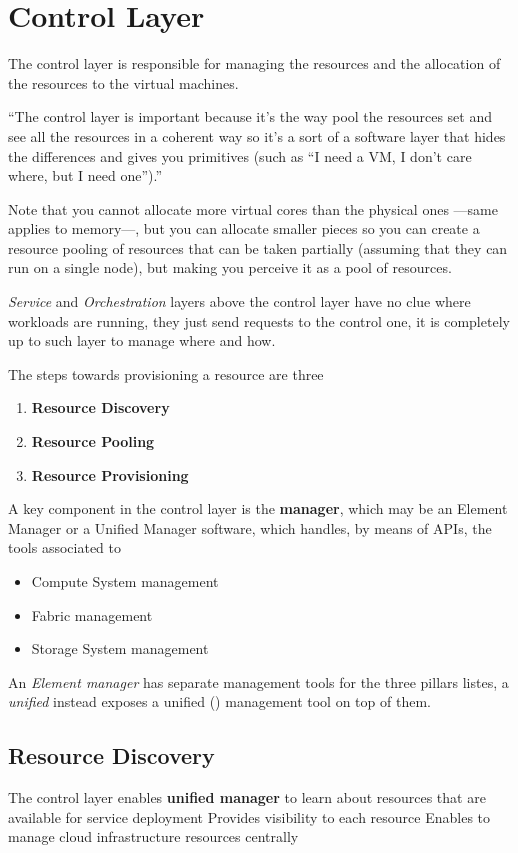 \section{Control Layer}
The control layer is responsible for managing the resources and the allocation of the resources to the virtual machines.

\begin{definition}
   ``The control layer is important because it's the way pool the resources set and see all the resources in a coherent way so it's a sort of a software layer that hides the differences and gives you primitives (such as ``I need a VM, I don't care where, but I need one'').''
\end{definition}


Note that you cannot allocate more virtual cores than the physical ones ---same applies to memory---, but you can allocate smaller pieces so you can create a resource pooling of resources that can be taken partially (assuming that they can run on a single node), but making you perceive it as a pool of resources.

\textit{Service} and \textit{Orchestration} layers above the control layer have no clue where workloads are running, they just send requests to the control one, it is completely up to such layer to manage where and how. 
\nl

The steps towards provisioning a resource are three
\begin{enumerate}
   \item \textbf{Resource Discovery}
   \item \textbf{Resource Pooling}
   \item \textbf{Resource Provisioning}
\end{enumerate}

A key component in the control layer is the \textbf{manager}, which may be an Element Manager or a Unified Manager software, which handles, by means of APIs, the tools associated to
\begin{itemize}
   \item Compute System management
   \item Fabric management
   \item Storage System management
\end{itemize}
An \textit{Element manager} has separate management tools for the three pillars listes, a \textit{unified} instead exposes a unified (\smiley) management tool on top of them.

\subsection{Resource Discovery}
The control layer enables \textbf{unified manager} to learn about resources that are available for service deployment
Provides visibility to each resource
Enables to manage cloud infrastructure resources centrally


